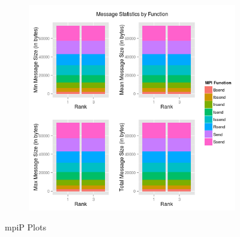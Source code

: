 \begin{figure}
\begin{subfigure}[b]{0.485\textwidth}
        \end{subfigure}\\
        \begin{subfigure}[b]{0.485\textwidth}
            \includegraphics[width=\textwidth]{include/pics/mpip/05_message2}
        \end{subfigure}%
        \caption{mpiP Plots}
        \label{fig:mpip}
\end{figure}